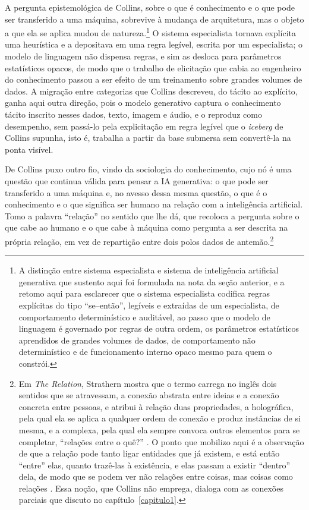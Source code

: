 A pergunta epistemológica de Collins, sobre o que é conhecimento e o que pode ser transferido a uma máquina, sobrevive à mudança de arquitetura, mas o objeto a que ela se aplica mudou de natureza.\footnote{A distinção entre sistema especialista e sistema de inteligência artificial generativa que sustento aqui foi formulada na nota da seção anterior, e a retomo aqui para esclarecer que o sistema especialista codifica regras explícitas do tipo \enquote{se--então}, legíveis e extraídas de um especialista, de comportamento determinístico e auditável, ao passo que o modelo de linguagem é governado por regras de outra ordem, os parâmetros estatísticos aprendidos de grandes volumes de dados, de comportamento não determinístico e de funcionamento interno opaco mesmo para quem o constrói.} O sistema especialista tornava explícita uma heurística e a depositava em uma regra legível, escrita por um especialista; o modelo de linguagem não dispensa regras, e sim as desloca para parâmetros estatísticos opacos, de modo que o trabalho de elicitação que cabia ao engenheiro do conhecimento passou a ser efeito de um treinamento sobre grandes volumes de dados. A migração entre categorias que Collins descreveu, do tácito ao explícito, ganha aqui outra direção, pois o modelo generativo captura o conhecimento tácito inscrito nesses dados, texto, imagem e áudio, e o reproduz como desempenho, sem passá-lo pela explicitação em regra legível que o \textit{iceberg} de Collins supunha, isto é, trabalha a partir da base submersa sem convertê-la na ponta visível.

De Collins puxo outro fio, vindo da sociologia do conhecimento, cujo nó é uma questão que continua válida para pensar a IA generativa: o que pode ser transferido a uma máquina e, no avesso dessa mesma questão, o que é o conhecimento e o que significa ser humano na relação com a inteligência artificial. Tomo a palavra \enquote{relação} no sentido que \textcite{strathern1995relation} lhe dá, que recoloca a pergunta sobre o que cabe ao humano e o que cabe à máquina como pergunta a ser descrita na própria relação, em vez de repartição entre dois polos dados de antemão.\footnote{Em \textit{The Relation}, Strathern mostra que o termo carrega no inglês dois sentidos que se atravessam, a conexão abstrata entre ideias e a conexão concreta entre pessoas, e atribui à relação duas propriedades, a holográfica, pela qual ela se aplica a qualquer ordem de conexão e produz instâncias de si mesma, e a complexa, pela qual ela sempre convoca outros elementos para se completar, \enquote{relações entre o quê?} \parencite[pp.~17--19]{strathern1995relation}. O ponto que mobilizo aqui é a observação de que a relação pode tanto ligar entidades que já existem, e está então \enquote{entre} elas, quanto trazê-las à existência, e elas passam a existir \enquote{dentro} dela, de modo que se podem ver não relações entre coisas, mas coisas como relações \parencite[p.~19]{strathern1995relation}. Essa noção, que Collins não emprega, dialoga com as conexões parciais que discuto no capítulo~\ref{capitulo1}.}

